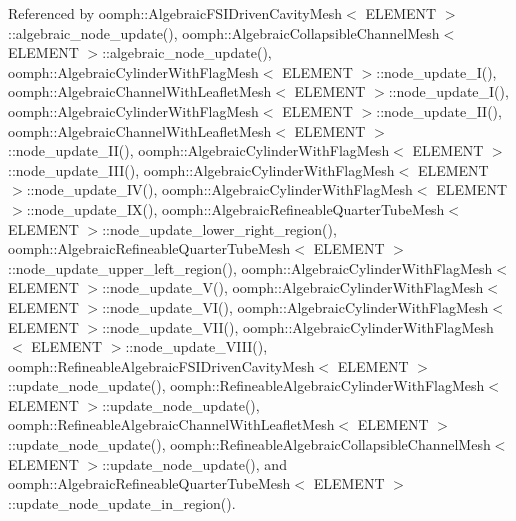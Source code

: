 Referenced by oomph\+::\+Algebraic\+F\+S\+I\+Driven\+Cavity\+Mesh$<$ E\+L\+E\+M\+E\+N\+T $>$\+::algebraic\+\_\+node\+\_\+update(), oomph\+::\+Algebraic\+Collapsible\+Channel\+Mesh$<$ E\+L\+E\+M\+E\+N\+T $>$\+::algebraic\+\_\+node\+\_\+update(), oomph\+::\+Algebraic\+Cylinder\+With\+Flag\+Mesh$<$ E\+L\+E\+M\+E\+N\+T $>$\+::node\+\_\+update\+\_\+\+I(), oomph\+::\+Algebraic\+Channel\+With\+Leaflet\+Mesh$<$ E\+L\+E\+M\+E\+N\+T $>$\+::node\+\_\+update\+\_\+\+I(), oomph\+::\+Algebraic\+Cylinder\+With\+Flag\+Mesh$<$ E\+L\+E\+M\+E\+N\+T $>$\+::node\+\_\+update\+\_\+\+I\+I(), oomph\+::\+Algebraic\+Channel\+With\+Leaflet\+Mesh$<$ E\+L\+E\+M\+E\+N\+T $>$\+::node\+\_\+update\+\_\+\+I\+I(), oomph\+::\+Algebraic\+Cylinder\+With\+Flag\+Mesh$<$ E\+L\+E\+M\+E\+N\+T $>$\+::node\+\_\+update\+\_\+\+I\+I\+I(), oomph\+::\+Algebraic\+Cylinder\+With\+Flag\+Mesh$<$ E\+L\+E\+M\+E\+N\+T $>$\+::node\+\_\+update\+\_\+\+I\+V(), oomph\+::\+Algebraic\+Cylinder\+With\+Flag\+Mesh$<$ E\+L\+E\+M\+E\+N\+T $>$\+::node\+\_\+update\+\_\+\+I\+X(), oomph\+::\+Algebraic\+Refineable\+Quarter\+Tube\+Mesh$<$ E\+L\+E\+M\+E\+N\+T $>$\+::node\+\_\+update\+\_\+lower\+\_\+right\+\_\+region(), oomph\+::\+Algebraic\+Refineable\+Quarter\+Tube\+Mesh$<$ E\+L\+E\+M\+E\+N\+T $>$\+::node\+\_\+update\+\_\+upper\+\_\+left\+\_\+region(), oomph\+::\+Algebraic\+Cylinder\+With\+Flag\+Mesh$<$ E\+L\+E\+M\+E\+N\+T $>$\+::node\+\_\+update\+\_\+\+V(), oomph\+::\+Algebraic\+Cylinder\+With\+Flag\+Mesh$<$ E\+L\+E\+M\+E\+N\+T $>$\+::node\+\_\+update\+\_\+\+V\+I(), oomph\+::\+Algebraic\+Cylinder\+With\+Flag\+Mesh$<$ E\+L\+E\+M\+E\+N\+T $>$\+::node\+\_\+update\+\_\+\+V\+I\+I(), oomph\+::\+Algebraic\+Cylinder\+With\+Flag\+Mesh$<$ E\+L\+E\+M\+E\+N\+T $>$\+::node\+\_\+update\+\_\+\+V\+I\+I\+I(), oomph\+::\+Refineable\+Algebraic\+F\+S\+I\+Driven\+Cavity\+Mesh$<$ E\+L\+E\+M\+E\+N\+T $>$\+::update\+\_\+node\+\_\+update(), oomph\+::\+Refineable\+Algebraic\+Cylinder\+With\+Flag\+Mesh$<$ E\+L\+E\+M\+E\+N\+T $>$\+::update\+\_\+node\+\_\+update(), oomph\+::\+Refineable\+Algebraic\+Channel\+With\+Leaflet\+Mesh$<$ E\+L\+E\+M\+E\+N\+T $>$\+::update\+\_\+node\+\_\+update(), oomph\+::\+Refineable\+Algebraic\+Collapsible\+Channel\+Mesh$<$ E\+L\+E\+M\+E\+N\+T $>$\+::update\+\_\+node\+\_\+update(), and oomph\+::\+Algebraic\+Refineable\+Quarter\+Tube\+Mesh$<$ E\+L\+E\+M\+E\+N\+T $>$\+::update\+\_\+node\+\_\+update\+\_\+in\+\_\+region().

\mbox{\label{classoomph_1_1AlgebraicNode_aa242d4039f28e65c407bf90033489a75}} 
